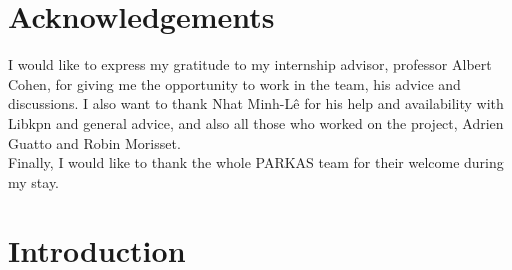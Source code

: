 \documentclass[a4paper,11pt]{article}
\begin{document}
\section*{Acknowledgements}
I would like to express my gratitude to my internship advisor, professor Albert Cohen,
for giving me the opportunity to work in the team, his advice and discussions. I also
want to thank Nhat Minh-L\^e for his help and availability with Libkpn and general advice,
and also all those who worked on the project, Adrien Guatto and Robin Morisset. \\
Finally, I would like to thank the whole PARKAS team for their welcome during my stay.

\clearpage
\newpage
\null
\vspace{5cm}
\begin{abstract}
The main purpose of this internship is to study and implement new applications in a complete 
runtime system for Kahn process networks, Libkpn, developed in the Inria/ENS PARKAS team. \\
The implementation of 1-d jacobi stencil application in the special case of small iteration numbers,
using a special tiling technique, shows better performance than implementations using the 
state-of-the-art OpenMP4 model for shared-memory concurrent programs. 
\end{abstract}
\newpage
\tableofcontents
\newpage

\section{Introduction}
\end{document}
